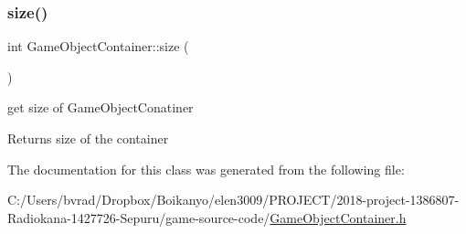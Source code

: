 \subsubsection{\texorpdfstring{size()}{size()}\hspace{0.1cm}{\footnotesize\ttfamily [2/2]}}
{\footnotesize\ttfamily int Game\+Object\+Container\+::size (\begin{DoxyParamCaption}{ }\end{DoxyParamCaption})\hspace{0.3cm}{\ttfamily [inline]}}



get size of Game\+Object\+Conatiner 

\begin{DoxyReturn}{Returns}
size of the container 
\end{DoxyReturn}


The documentation for this class was generated from the following file\+:\begin{DoxyCompactItemize}
\item 
C\+:/\+Users/bvrad/\+Dropbox/\+Boikanyo/elen3009/\+P\+R\+O\+J\+E\+C\+T/2018-\/project-\/1386807-\/\+Radiokana-\/1427726-\/\+Sepuru/game-\/source-\/code/\mbox{\hyperlink{_game_object_container_8h}{Game\+Object\+Container.\+h}}\end{DoxyCompactItemize}
